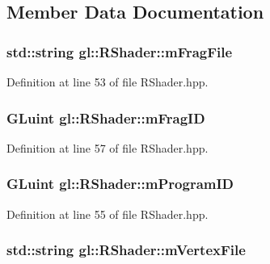 \subsection{Member Data Documentation}
\hypertarget{classgl_1_1_r_shader_a6ce293498749d93a4fbc991b17a4cf70}{
\subsubsection[{m\-Frag\-File}]{\setlength{\rightskip}{0pt plus 5cm}std\-::string gl\-::\-R\-Shader\-::m\-Frag\-File\hspace{0.3cm}{\ttfamily [protected]}}}\label{classgl_1_1_r_shader_a6ce293498749d93a4fbc991b17a4cf70}


Definition at line 53 of file R\-Shader.\-hpp.

\hypertarget{classgl_1_1_r_shader_a0e077d5a150093c7af3c9ce047fcbe8d}{
\subsubsection[{m\-Frag\-I\-D}]{\setlength{\rightskip}{0pt plus 5cm}G\-Luint gl\-::\-R\-Shader\-::m\-Frag\-I\-D\hspace{0.3cm}{\ttfamily [protected]}}}\label{classgl_1_1_r_shader_a0e077d5a150093c7af3c9ce047fcbe8d}


Definition at line 57 of file R\-Shader.\-hpp.

\hypertarget{classgl_1_1_r_shader_a61ad380e879e29f8c052cad73158c54e}{
\subsubsection[{m\-Program\-I\-D}]{\setlength{\rightskip}{0pt plus 5cm}G\-Luint gl\-::\-R\-Shader\-::m\-Program\-I\-D\hspace{0.3cm}{\ttfamily [protected]}}}\label{classgl_1_1_r_shader_a61ad380e879e29f8c052cad73158c54e}


Definition at line 55 of file R\-Shader.\-hpp.

\hypertarget{classgl_1_1_r_shader_a2285ac811c39bd59866a0239e04932b2}{
\subsubsection[{m\-Vertex\-File}]{\setlength{\rightskip}{0pt plus 5cm}std\-::string gl\-::\-R\-Shader\-::m\-Vertex\-File\hspace{0.3cm}{\ttfamily [protected]}}}\label{classgl_1_1_r_shader_a2285ac811c39bd59866a0239e04932b2}



